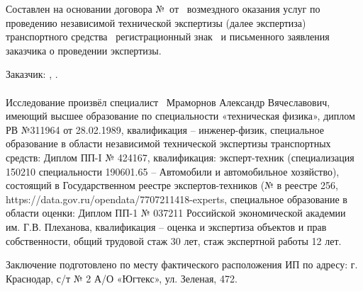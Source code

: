 \vspace{2mm}
\noindent %
Составлен на основании	договора № \NomerDoc\,от \, возмездного оказания услуг   по проведению независимой технической экспертизы (далее экспертиза)  транспортного средства \, регистрационный знак \, и письменного заявления заказчика о проведении экспертизы.

\noindent Заказчик: , . 




\paragraph*{}
Исследование произвёл  специалист
\,  Мраморнов Александр Вячеславович, имеющий высшее  образование по специальности «техническая физика», диплом РВ №311964 от 28.02.1989, квалификация -- инженер-физик, специальное образование в области независимой технической экспертизы транспортных средств: Диплом ПП-I № 424167, квалификация: эксперт-техник (специализация 150210 специальности 190601.65 – Автомобили и автомобильное хозяйство), состоящий в Государственном реестре экспертов-техников (№ в реестре 256, https://data.gov.ru/opendata/7707211418-experts, специальное образование в области оценки: Диплом ПП-1 № 037211 Российской экономической академии им. Г.В. Плеханова, квалификация -- оценка и экспертиза объектов и прав собственности,   общий трудовой  стаж 30 лет, стаж  экспертной работы  12 лет. 


\par Заключение подготовлено по месту фактического расположения ИП по адресу: г. Краснодар, с/т № 2 А/О «Югтекс», ул. Зеленая, 472.
\vspace{4mm}